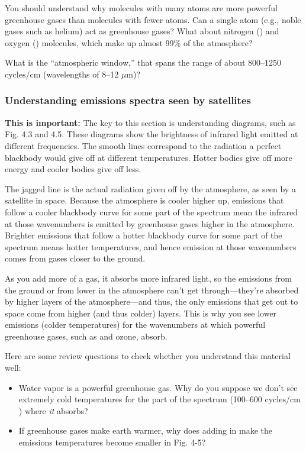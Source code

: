 \documentclass[
]{article}
\providecommand{\tightlist}{%
  \setlength{\itemsep}{0pt}\setlength{\parskip}{0pt}}
\newcommand{\Ntwo}{\ce{N2}}
\newcommand{\Otwo}{\ce{O2}}
\newcommand{\COO}{\ce{CO2}}
\begin{document}
You should understand why molecules with many atoms are more powerful
greenhouse gases than molecules with fewer atoms. Can a single atom
(e.g., noble gases such as helium) act as greenhouse gases? What about
nitrogen (\Ntwo{}) and oxygen (\Otwo{}) molecules, which make up almost
99\% of the atmosphere?

What is the ``atmospheric window,'' that spans the range of about
800--1250 \(\text{cycles}/\text{cm}\) (wavelengths of 8--12 \(\mu\)m)?

\hypertarget{understanding-emissions-spectra-seen-by-satellites}{%
\subsubsection{Understanding emissions spectra seen by
satellites}\label{understanding-emissions-spectra-seen-by-satellites}}

\textbf{This is important:} The key to this section is understanding
diagrams, such as Fig. 4.3 and 4.5. These diagrams show the brightness
of infrared light emitted at different frequencies. The smooth lines
correspond to the radiation a perfect blackbody would give off at
different temperatures. Hotter bodies give off more energy and cooler
bodies give off less.

The jagged line is the actual radiation given off by the atmosphere, as
seen by a satellite in space. Because the atmosphere is cooler higher
up, emissions that follow a cooler blackbody curve for some part of the
spectrum mean the infrared at those wavenumbers is emitted by greenhouse
gases higher in the atmosphere. Brighter emissions that follow a hotter
blackbody curve for some part of the spectrum means hotter temperatures,
and hence emission at those wavenumbers comes from gases closer to the
ground.

As you add more of a gas, it absorbs more infrared light, so the
emissions from the ground or from lower in the atmosphere can't get
through---they're absorbed by higher layers of the atmosphere---and
thus, the only emissions that get out to space come from higher (and
thus colder) layers. This is why you see lower emissions (colder
temperatures) for the wavenumbers at which powerful greenhouse gases,
such as \COO{} and ozone, absorb.

Here are some review questions to check whether you understand this
material well:

\begin{itemize}
\tightlist
\item
  Water vapor is a powerful greenhouse gas. Why do you suppose we don't
  see extremely cold temperatures for the part of the spectrum (100--600
  \(\text{cycles}/\text{cm}\)) where \emph{it} absorbs?
\item
  If greenhouse gases make earth warmer, why does adding \COO{} in make
  the emissions temperatures become smaller in Fig. 4-5?
\end{itemize}
\end{document}
